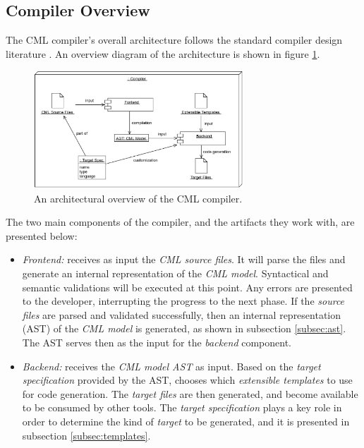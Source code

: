 \subsection{Compiler Overview}\label{subsec:overview}

The CML compiler's overall architecture follows the standard compiler design literature \cite{torben}. An overview diagram of the architecture is shown in figure \ref{fig:overview}.

\begin{figure}
\centering
\includegraphics[width=0.7\textwidth]{compiler/figure-overview}
\caption{An architectural overview of the CML compiler.}
\label{fig:overview}
\end{figure}

The two main components of the compiler,
and the artifacts they work with,
are presented below:

\begin{itemize}

\item \emph{Frontend:} receives as input the \emph{CML source files}.
It will parse the files and generate an internal representation of the \emph{CML model}.
Syntactical and semantic validations will be executed at this point.
Any errors are presented to the developer, interrupting the progress to the next phase.
If the \emph{source files} are parsed and validated successfully, then an internal representation (AST) of the \emph{CML model} is generated, as shown in subsection \ref{subsec:ast}.
The AST serves then as the input for the \emph{backend} component.

\item \emph{Backend:} receives the \emph{CML model AST} as input.
Based on the \emph{target specification} provided by the AST, chooses which \emph{extensible templates} to use for code generation.
The \emph{target files} are then generated, and become available to be consumed by other tools. The \emph{target specification} plays a key role in order to determine the kind of \emph{target} to be generated, and it is presented in subsection \ref{subsec:templates}.

\end{itemize}